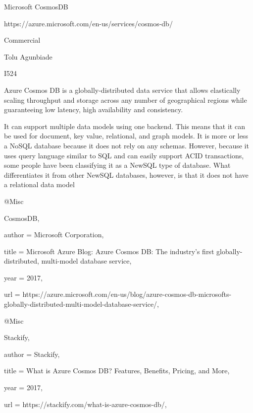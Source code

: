 Microsoft CosmosDB

https://azure.microsoft.com/en-us/services/cosmos-db/

Commercial

Tolu Agunbiade

I524

Azure Cosmos DB is a globally-distributed data service that allows elastically scaling throughput and storage across any number of geographical regions while guaranteeing low latency, high availability and consistency\cite{CosmosDB}.

It can support multiple data models using one backend. This means that it can be used for document, key value, relational, and graph models. It is more or less a NoSQL database because it does not rely on any schemas. However, because it uses query language similar to SQL and can easily support ACID transactions, some people have been classifying it as a NewSQL type of database. What differentiates it from other NewSQL databases, however, is that it does not have a relational data model\cite{Stackify}

@Misc{CosmosDB,

  author = {Microsoft Corporation},

  title  = {Microsoft Azure Blog: Azure Cosmos DB: The industry’s first globally-distributed, multi-model database service},

  year   = {2017},

  url    = {https://azure.microsoft.com/en-us/blog/azure-cosmos-db-microsofts-globally-distributed-multi-model-database-service/},

}

@Misc{Stackify,

  author = {Stackify},

  title  = {What is Azure Cosmos DB? Features, Benefits, Pricing, and More},

  year   = {2017},

url = {https://stackify.com/what-is-azure-cosmos-db/},

}
